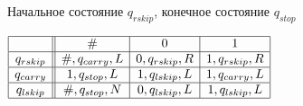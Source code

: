 \documentclass{article}
\begin{document}
	Начальное состояние $q_{rskip}$, конечное состояние $q_{stop}$
	\begin{center}
	\def\arraystretch{1.8}
	\fontsize{14}{14}
	\begin{center}
		$\begin{array}{|c||c|c|c|}
		\hline 
		\			& \# 				& 0 				& 1 				\\ \hline
		q_{rskip} 	& \#, q_{carry}, L	& 0, q_{rskip}, R	& 1, q_{rskip}, R	\\ \hline
		q_{carry} 	& 1, q_{stop}, L 	& 1, q_{lskip}, L	& 1, q_{carry}, L	\\ \hline
		q_{lskip} 	& \#, q_{stop}, N 	& 0, q_{lskip}, L	& 1, q_{lskip}, L	\\ \hline 
		\end{array}$
	\end{center}
	\fontsize{12}{12}
	\end{center}
	\vfill
	\newpage
	
\end{document}
